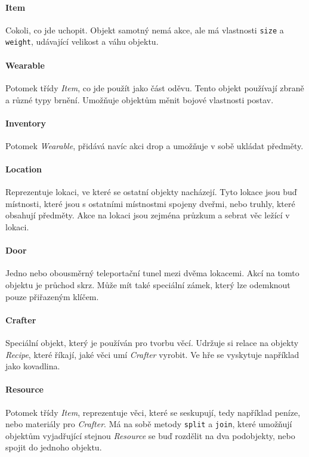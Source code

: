 \documentclass[11pt, a4paper]{article}
\def\class#1{\emph{#1}}
\begin{document}
\paragraph{Item} Cokoli, co jde uchopit. Objekt samotný nemá akce, ale má vlastnosti \texttt{size} a \texttt{weight}, udávající velikost a váhu objektu.

\paragraph{Wearable} Potomek třídy \class{Item}, co jde použít jako část oděvu. Tento objekt používají zbraně a různé typy brnění. Umožňuje objektům měnit bojové vlastnosti postav.

\paragraph{Inventory} Potomek \class{Wearable}, přidává navíc akci drop a umožňuje v sobě ukládat předměty.

\paragraph{Location} Reprezentuje lokaci, ve které se ostatní objekty nacházejí. Tyto lokace jsou buď místnosti, které jsou s ostatními místnostmi spojeny dveřmi, nebo truhly, které obsahují předměty. Akce na lokaci jsou zejména průzkum a sebrat věc ležící v lokaci.

\paragraph{Door} Jedno nebo obousměrný teleportační tunel mezi dvěma lokacemi. Akcí na tomto objektu je průchod skrz. Může mít také speciální zámek, který lze odemknout pouze přiřazeným klíčem.

\paragraph{Crafter} Speciální objekt, který je používán pro tvorbu věcí. Udržuje si relace na objekty \class{Recipe}, které říkají, jaké věci umí \class{Crafter} vyrobit. Ve hře se vyskytuje například jako kovadlina.

\paragraph{Resource} Potomek třídy \class{Item}, reprezentuje věci, které se seskupují, tedy například peníze, nebo materiály pro \class{Crafter}. Má na sobě metody \texttt{split} a \texttt{join}, které umožňují objektům vyjadřující stejnou \class{Resource} se buď rozdělit na dva podobjekty, nebo spojit do jednoho objektu.
\end{document}
